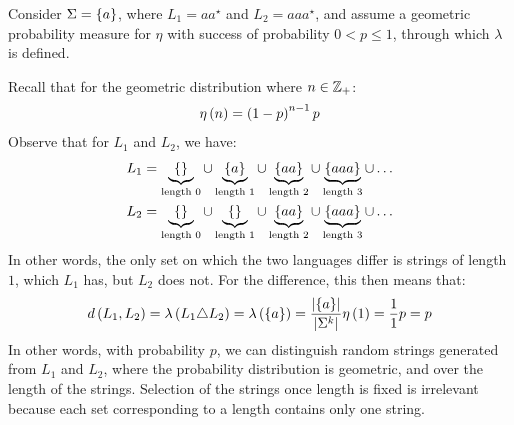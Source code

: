 \begin{example}
  Consider \(\Sigma = \left\{a\right\}\),
  where \(L_1 = aa^\star\) and \(L_2 = aaa^\star\),
  and assume a geometric probability measure for \(\eta\)
  with success of probability \(0 < p \leq 1\),
  through which \(\lambda\) is defined.

  Recall that for the geometric distribution where \(n \in \mathbb{Z}_{+}\):
  \begin{align*}
    \eta\left(n\right) = \left(1 - p\right)^{n - 1} p
  \end{align*}
  Observe that for \(L_1\) and \(L_2\), we have:
  \begin{align*}
    L_1 &=
      \underbrace{\left\{\right\}}_{\text{length \(0\)}} \cup
      \underbrace{\left\{a\right\}}_{\text{length \(1\)}} \cup
      \underbrace{\left\{aa\right\}}_{\text{length \(2\)}} \cup
      \underbrace{\left\{aaa\right\}}_{\text{length \(3\)}} \cup
      \ldots \\
    L_2 &= 
      \underbrace{\left\{\right\}}_{\text{length \(0\)}} \cup
      \underbrace{\left\{\right\}}_{\text{length \(1\)}} \cup
      \underbrace{\left\{aa\right\}}_{\text{length \(2\)}} \cup
      \underbrace{\left\{aaa\right\}}_{\text{length \(3\)}} \cup
      \ldots
  \end{align*}
  In other words, the only set on which the two languages differ is
  strings of length \(1\), which \(L_1\) has, but \(L_2\) does not.
  For the difference, this then means that:
  \begin{align*}
    d\left(L_1, L_2\right)
      = \lambda\left(L_1 \triangle L_2\right)
      = \lambda\left(\left\{a\right\}\right)
      = \frac{\left\lvert\left\{a\right\}\right\rvert}{\left\lvert\Sigma^k\right\rvert} \eta \left(1\right)
      = \frac{1}{1} p = p
  \end{align*}
  In other words, with probability \(p\),
  we can distinguish random strings generated from \(L_1\) and \(L_2\),
  where the probability distribution is geometric,
  and over the length of the strings.
  Selection of the strings once length is fixed is irrelevant because
  each set corresponding to a length contains only one string.
\end{example}
